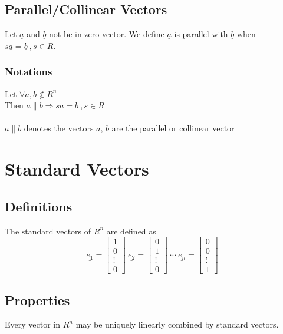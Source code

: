 \documentclass[12pt]{article}
\begin{document}
\subsection{Parallel/Collinear Vectors}
Let $\underline{a}$ and $\underline{b}$ not be in zero vector. We define $\underline{a}$ is parallel with $\underline{b}$ when $s\underline{a} = \underline{b}\ ,s \in R$.\\
\subsubsection{Notations}
Let $\forall \underline{a},\underline{b} \notin R^n$\\

Then $\underline{a} \parallel \underline{b} \Rightarrow s\underline{a} = \underline{b}\ ,s \in R$\\\\
$\underline{a} \parallel \underline{b}$ denotes the vectors $\underline{a}$, $\underline{b}$ are the parallel or collinear vector\\

\section{Standard Vectors}
\subsection{Definitions}
The standard vectors of $R^n$ are defined as
\begin{equation}
\underline{e_1} = \left[
\begin{array}{c}
1\\
0\\
\vdots\\
0
\end{array}
\right]\ 
\underline{e_2} = \left[
\begin{array}{c}
0\\
1\\
\vdots\\
0
\end{array}
\right]\ \cdots \ 
\underline{e_n} = \left[
\begin{array}{c}
0\\
0\\
\vdots\\
1
\end{array}
\right]\ 
\end{equation}
\subsection{Properties}
Every vector in $R^n$ may be uniquely linearly combined by standard vectors.
\end{document}

